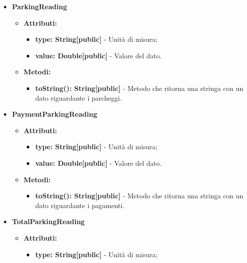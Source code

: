 \documentclass[8pt]{article}
\begin{document}
\begin{itemize}
\begin{itemize}
\begin{itemize}
        \end{itemize}
    \end{itemize}
    \item \textbf{ParkingReading}
    \begin{itemize}
        \item \textbf{Attributi:}
        \begin{itemize}
            \item \textbf{type: String[public]} - Unità di misura;
            \item \textbf{value: Double[public]} - Valore del dato.
        \end{itemize}
    \end{itemize}
    \begin{itemize}
        \item \textbf{Metodi:}
        \begin{itemize}
            \item \textbf{toString(): String[public]} - Metodo che ritorna una stringa con un dato riguardante i parcheggi.
        \end{itemize}
    \end{itemize}
    \item \textbf{PaymentParkingReading}
    \begin{itemize}
        \item \textbf{Attributi:}
        \begin{itemize}
            \item \textbf{type: String[public]} - Unità di misura;
            \item \textbf{value: Double[public]} - Valore del dato.
        \end{itemize}
    \end{itemize}
    \begin{itemize}
        \item \textbf{Metodi:}
        \begin{itemize}
            \item \textbf{toString(): String[public]} - Metodo che ritorna una stringa con un dato riguardante i pagamenti.
        \end{itemize}
    \end{itemize}
    \item \textbf{TotalParkingReading}
    \begin{itemize}
        \item \textbf{Attributi:}
        \begin{itemize}
            \item \textbf{type: String[public]} - Unità di misura;

\end{itemize}
\end{itemize}
\end{itemize}
\end{document}
